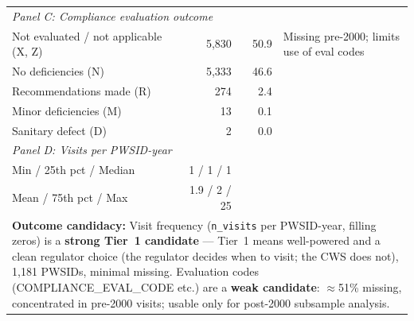\begin{table}[h!]
\begin{tabular}{p{5.5cm}rrl}
\multicolumn{4}{l}{\textit{Panel C: Compliance evaluation outcome}} \\
Not evaluated / not applicable (X, Z) & 5,830 & 50.9 & Missing pre-2000; limits use of eval codes \\
No deficiencies (N) & 5,333 & 46.6 & \\
Recommendations made (R) & 274 & 2.4 & \\
Minor deficiencies (M) & 13 & 0.1 & \\
Sanitary defect (D) & 2 & 0.0 & \\[6pt]

\multicolumn{4}{l}{\textit{Panel D: Visits per PWSID-year}} \\
Min / 25th pct / Median & 1 / 1 / 1 & & \\
Mean / 75th pct / Max & 1.9 / 2 / 25 & & \\
\hline\hline
\multicolumn{4}{p{13cm}}{\footnotesize \textbf{Outcome candidacy:} Visit frequency (\texttt{n\_visits} per PWSID-year, filling zeros) is a \textbf{strong Tier~1 candidate} — Tier~1 means well-powered and a clean regulator choice (the regulator decides when to visit; the CWS does not), 1,181 PWSIDs, minimal missing. Evaluation codes (COMPLIANCE\_EVAL\_CODE etc.) are a \textbf{weak candidate}: $\approx$51\% missing, concentrated in pre-2000 visits; usable only for post-2000 subsample analysis.} \\
\end{tabular}
\end{table}

